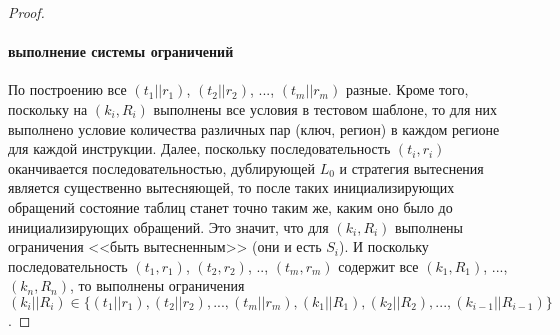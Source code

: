 \begin{proof}
\paragraph{выполнение системы ограничений} По построению все $(t_1||r_1)$, $(t_2||r_2)$, ..., $(t_m||r_m)$ разные. Кроме того, поскольку на $(k_i, R_i)$ выполнены все условия в тестовом шаблоне, то для них выполнено условие количества различных пар (ключ, регион) в каждом регионе для каждой инструкции. Далее, поскольку последовательность $(t_i, r_i)$ оканчивается последовательностью, дублирующей $L_0$ и стратегия вытеснения является существенно вытесняющей, то после таких инициализирующих обращений состояние таблиц станет точно таким же, каким оно было до инициализирующих обращений. Это значит, что для $(k_i, R_i)$ выполнены ограничения <<быть вытесненным>> (они и есть $S_i$). И поскольку последовательность $(t_1, r_1)$, $(t_2, r_2)$, .., $(t_m, r_m)$ содержит все $(k_1, R_1)$, ..., $(k_n, R_n)$, то выполнены ограничения\\$(k_i||R_i) \in \{(t_1||r_1), (t_2||r_2), ..., (t_m||r_m), (k_1||R_1), (k_2||R_2), ..., (k_{i-1}||R_{i-1})\}$.
\end{proof}

